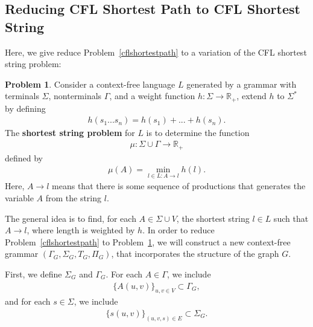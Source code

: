 \documentclass[10pt,twocolumn]{article}
\theoremstyle{definition}
\newtheorem{problem}[theorem]{Problem}
\begin{document}
\subsection{Reducing CFL Shortest Path to CFL Shortest String}

\noindent Here, we give reduce Problem~\ref{cflshortestpath} to a variation of the CFL shortest string problem:
\begin{problem}
\label{cflshorteststring}
\noindent Consider a context-free language $L$ generated by a grammar with terminals $\Sigma$, nonterminals $\Gamma$, and a weight function $h:\Sigma\to\mathbb{R}_+$, extend $h$ to $\Sigma^*$ by defining
\begin{align*}
h(s_1...s_n)=h(s_1)+...+h(s_n).
\end{align*}
\noindent The {\bf shortest string problem} for $L$ is to determine the function
\begin{align*}
\mu:\Sigma\cup\Gamma\to\mathbb{R}_+
\end{align*}
\noindent defined by
\begin{align*}
\mu(A)=\min_{l\in L:A\to l}h(l).
\end{align*}
\noindent Here, $A\to l$ means that there is some sequence of productions that generates the variable $A$ from the string $l$.
\end{problem}

\noindent The general idea is to find, for each $A\in \Sigma\cup V$, the shortest string $l\in L$ such that $A\to l$, where length is weighted by $h$. In order to reduce Problem~\ref{cflshortestpath} to Problem~\ref{cflshorteststring}, we will construct a new context-free grammar $(\Gamma_G,\Sigma_G,T_G,\Pi_G)$, that incorporates the structure of the graph $G$.

First, we define $\Sigma_G$ and $\Gamma_G$. For each $A\in\Gamma$, we include
\begin{align*}
\{A(u,v)\}_{u,v\in V}\subset\Gamma_G,
\end{align*}
and for each $s\in\Sigma$, we include
\begin{align*}
\{s(u,v)\}_{(u,v,s)\in E}\subset\Sigma_G.
\end{align*}
\end{document}
